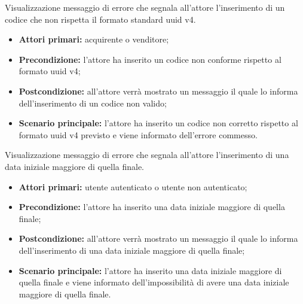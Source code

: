 \label{estensione:codice-ordine-non-valido}

Visualizzazione messaggio di errore che segnala all'attore l'inserimento di un codice che non rispetta il formato standard uuid v4.
\begin{itemize}
    \item \textbf{Attori primari:} acquirente o venditore;
    \item \textbf{Precondizione:} l'attore ha inserito un codice non conforme rispetto al formato uuid v4;
    \item \textbf{Postcondizione:} all'attore verrà mostrato un messaggio il quale lo informa dell'inserimento di un codice non valido;
    \item \textbf{Scenario principale:} l'attore ha inserito un codice non corretto rispetto al formato uuid v4 previsto e viene informato dell'errore commesso.
\end{itemize}

\label{estensione:data-iniziale-maggiore-data-finale}

Visualizzazione messaggio di errore che segnala all'attore l'inserimento di una data iniziale maggiore di quella finale.
\begin{itemize}
    \item \textbf{Attori primari:} utente autenticato o utente non autenticato;
    \item \textbf{Precondizione:} l'attore ha inserito una data iniziale maggiore di quella finale;
    \item \textbf{Postcondizione:} all'attore verrà mostrato un messaggio il quale lo informa dell'inserimento di una data iniziale maggiore di quella finale;
    \item \textbf{Scenario principale:} l'attore ha inserito una data iniziale maggiore di quella finale e viene informato dell'impossibilità di avere una data iniziale maggiore di quella finale.
\end{itemize}

\label{estensione:quantita-da-aggiungere-al-carrello-non-valida}


